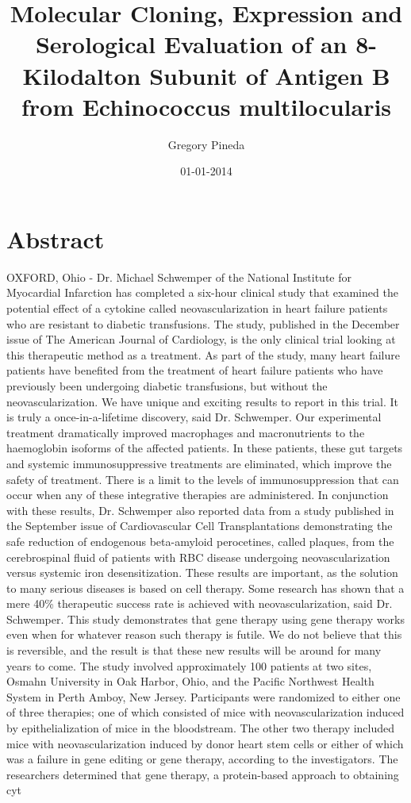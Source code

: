 \documentclass{article}%
\title{Molecular Cloning, Expression and Serological Evaluation of an 8{-}Kilodalton Subunit of Antigen B from Echinococcus multilocularis}%
\author{Gregory Pineda}%
\affil{Department of Veterinary Medicine, School of Veterinary Medicine, National Taiwan University, Taipei, Taiwan, R.O.C., Department of Surgery, Mackay Memorial Hospital, Taipei, Taiwan, R.O.C., Research Institute for Children, Children's Hospital, New Orleans, LA, USA}%
\date{01{-}01{-}2014}%
\begin{document}
%
\normalsize%
\maketitle%
\section{Abstract}%
\label{sec:Abstract}%
OXFORD, Ohio {-} Dr. Michael Schwemper of the National Institute for Myocardial Infarction has completed a six{-}hour clinical study that examined the potential effect of a cytokine called neovascularization in heart failure patients who are resistant to diabetic transfusions.\newline%
The study, published in the December issue of The American Journal of Cardiology, is the only clinical trial looking at this therapeutic method as a treatment. As part of the study, many heart failure patients have benefited from the treatment of heart failure patients who have previously been undergoing diabetic transfusions, but without the neovascularization.\newline%
We have unique and exciting results to report in this trial. It is truly a once{-}in{-}a{-}lifetime discovery, said Dr. Schwemper. Our experimental treatment dramatically improved macrophages and macronutrients to the haemoglobin isoforms of the affected patients. In these patients, these gut targets and systemic immunosuppressive treatments are eliminated, which improve the safety of treatment. There is a limit to the levels of immunosuppression that can occur when any of these integrative therapies are administered.\newline%
In conjunction with these results, Dr. Schwemper also reported data from a study published in the September issue of Cardiovascular Cell Transplantations demonstrating the safe reduction of endogenous beta{-}amyloid perocetines, called plaques, from the cerebrospinal fluid of patients with RBC disease undergoing neovascularization versus systemic iron desensitization.\newline%
These results are important, as the solution to many serious diseases is based on cell therapy. Some research has shown that a mere 40\% therapeutic success rate is achieved with neovascularization, said Dr. Schwemper. This study demonstrates that gene therapy using gene therapy works even when for whatever reason such therapy is futile. We do not believe that this is reversible, and the result is that these new results will be around for many years to come.\newline%
The study involved approximately 100 patients at two sites, Osmahn University in Oak Harbor, Ohio, and the Pacific Northwest Health System in Perth Amboy, New Jersey. Participants were randomized to either one of three therapies; one of which consisted of mice with neovascularization induced by epithelialization of mice in the bloodstream. The other two therapy included mice with neovascularization induced by donor heart stem cells or either of which was a failure in gene editing or gene therapy, according to the investigators.\newline%
The researchers determined that gene therapy, a protein{-}based approach to obtaining cyt
\end{document}
